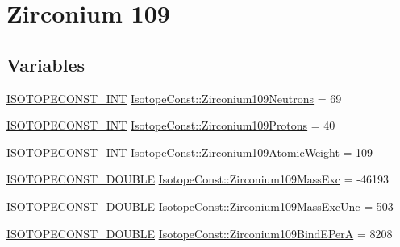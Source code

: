 \hypertarget{group___isotope_const-_zirconium-_zr109}{}\section{Zirconium 109}
\label{group___isotope_const-_zirconium-_zr109}
\subsection*{Variables}
\begin{DoxyCompactItemize}
\item 
\mbox{\hyperlink{group___isotope_const-_macros_ga5f18360b3e99483a35c32d789e62621c}{I\+S\+O\+T\+O\+P\+E\+C\+O\+N\+S\+T\+\_\+\+I\+NT}} \mbox{\hyperlink{group___isotope_const-_zirconium-_zr109_ga3ad1ec719b632a1ab035f51791c89c6c}{Isotope\+Const\+::\+Zirconium109\+Neutrons}} = 69
\item 
\mbox{\hyperlink{group___isotope_const-_macros_ga5f18360b3e99483a35c32d789e62621c}{I\+S\+O\+T\+O\+P\+E\+C\+O\+N\+S\+T\+\_\+\+I\+NT}} \mbox{\hyperlink{group___isotope_const-_zirconium-_zr109_gace0221ff2e31d74b228cad745d52ed4c}{Isotope\+Const\+::\+Zirconium109\+Protons}} = 40
\item 
\mbox{\hyperlink{group___isotope_const-_macros_ga5f18360b3e99483a35c32d789e62621c}{I\+S\+O\+T\+O\+P\+E\+C\+O\+N\+S\+T\+\_\+\+I\+NT}} \mbox{\hyperlink{group___isotope_const-_zirconium-_zr109_gac8ba32c5e4ec25d93e46e86c0b66bd8c}{Isotope\+Const\+::\+Zirconium109\+Atomic\+Weight}} = 109
\item 
\mbox{\hyperlink{group___isotope_const-_macros_ga8f45a7272ce02c0b4c65c44636ed719a}{I\+S\+O\+T\+O\+P\+E\+C\+O\+N\+S\+T\+\_\+\+D\+O\+U\+B\+LE}} \mbox{\hyperlink{group___isotope_const-_zirconium-_zr109_ga26f4d1e30380e61b6cb1fde20cae9ee7}{Isotope\+Const\+::\+Zirconium109\+Mass\+Exc}} = -\/46193
\item 
\mbox{\hyperlink{group___isotope_const-_macros_ga8f45a7272ce02c0b4c65c44636ed719a}{I\+S\+O\+T\+O\+P\+E\+C\+O\+N\+S\+T\+\_\+\+D\+O\+U\+B\+LE}} \mbox{\hyperlink{group___isotope_const-_zirconium-_zr109_gae4866869743d9446e1b2702011e84857}{Isotope\+Const\+::\+Zirconium109\+Mass\+Exc\+Unc}} = 503
\item 
\mbox{\hyperlink{group___isotope_const-_macros_ga8f45a7272ce02c0b4c65c44636ed719a}{I\+S\+O\+T\+O\+P\+E\+C\+O\+N\+S\+T\+\_\+\+D\+O\+U\+B\+LE}} \mbox{\hyperlink{group___isotope_const-_zirconium-_zr109_ga442c5e51d714bdd8987e4f992dfe302e}{Isotope\+Const\+::\+Zirconium109\+Bind\+E\+PerA}} = 8208
\item 

\end{DoxyCompactItemize}
